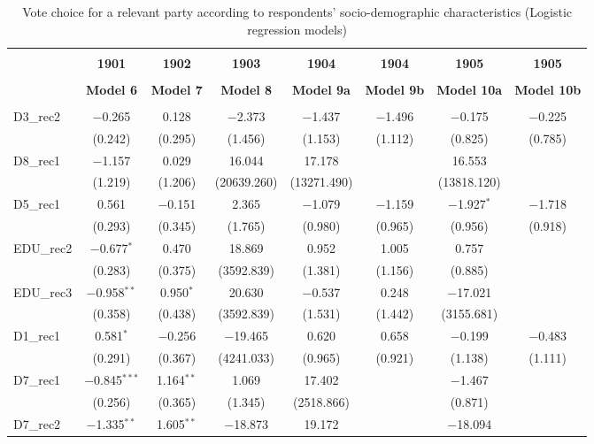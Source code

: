 \documentclass[
]{article}
\begin{document}
\begin{table}[!htbp] \centering 
  \caption{Vote choice for a relevant party according to respondents' 
                       socio-demographic characteristics (Logistic regression models)} 
  \label{table:full_logit_mt} 
\begin{tabular}{@{\extracolsep{5pt}}lccccccc} 
\\[-1.8ex]\hline \\[-1.8ex] 
 & \textbf{1901} & \textbf{1902} & \textbf{1903} & \textbf{1904} & \textbf{1904} & \textbf{1905} & \textbf{1905} \\ 
\\[-1.8ex] & \textbf{Model 6} & \textbf{Model 7} & \textbf{Model 8} & \textbf{Model 9a} & \textbf{Model 9b} & \textbf{Model 10a} & \textbf{Model 10b}\\ 
\hline \\[-1.8ex] 
 D3\_rec2 & $-$0.265 & 0.128 & $-$2.373 & $-$1.437 & $-$1.496 & $-$0.175 & $-$0.225 \\ 
  & (0.242) & (0.295) & (1.456) & (1.153) & (1.112) & (0.825) & (0.785) \\ 
  D8\_rec1 & $-$1.157 & 0.029 & 16.044 & 17.178 &  & 16.553 &  \\ 
  & (1.219) & (1.206) & (20639.260) & (13271.490) &  & (13818.120) &  \\ 
  D5\_rec1 & 0.561 & $-$0.151 & 2.365 & $-$1.079 & $-$1.159 & $-$1.927$^{*}$ & $-$1.718 \\ 
  & (0.293) & (0.345) & (1.765) & (0.980) & (0.965) & (0.956) & (0.918) \\ 
  EDU\_rec2 & $-$0.677$^{*}$ & 0.470 & 18.869 & 0.952 & 1.005 & 0.757 &  \\ 
  & (0.283) & (0.375) & (3592.839) & (1.381) & (1.156) & (0.885) &  \\ 
  EDU\_rec3 & $-$0.958$^{**}$ & 0.950$^{*}$ & 20.630 & $-$0.537 & 0.248 & $-$17.021 &  \\ 
  & (0.358) & (0.438) & (3592.839) & (1.531) & (1.442) & (3155.681) &  \\ 
  D1\_rec1 & 0.581$^{*}$ & $-$0.256 & $-$19.465 & 0.620 & 0.658 & $-$0.199 & $-$0.483 \\ 
  & (0.291) & (0.367) & (4241.033) & (0.965) & (0.921) & (1.138) & (1.111) \\ 
  D7\_rec1 & $-$0.845$^{***}$ & 1.164$^{**}$ & 1.069 & 17.402 &  & $-$1.467 &  \\ 
  & (0.256) & (0.365) & (1.345) & (2518.866) &  & (0.871) &  \\ 
  D7\_rec2 & $-$1.335$^{**}$ & 1.605$^{**}$ & $-$18.873 & 19.172 &  & $-$18.094 &  \\ 

\end{tabular}
\end{table}
\end{document}
